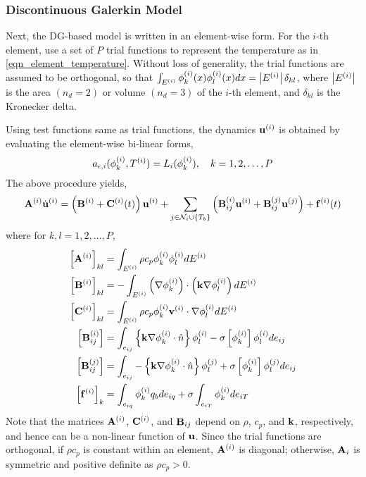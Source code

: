 \subsubsection{Discontinuous Galerkin Model}

Next, the DG-based model is written in an element-wise form. For the $i$-th element, use a set of $P$ trial functions to represent the temperature as in \cref{eqn_element_temperature}. Without loss of generality, the trial functions are assumed to be orthogonal, so that $\int_{E^{(i)}} \phi^{(i)}_k(x) \phi^{(i)}_l(x) dx = \left|E^{(i)}\right|\delta_{kl}$, where $\left|E^{(i)}\right|$ is the area $(n_d=2)$ or volume $(n_d=3)$ of the $i$-th element, and $\delta_{kl}$ is the Kronecker delta.

Using test functions same as trial functions, the dynamics $\mathbf{u}^{(i)}$ is obtained by evaluating the element-wise bi-linear forms,
\begin{equation}
    a_{\epsilon,i}(\phi_k^{(i)},T^{(i)}) = L_i(\phi_k^{(i)}),\quad k=1,2,\dots,P
\end{equation}
The above procedure yields,
\begin{equation}
    \mathbf{A}^{(i)}\dot{\mathbf{u}}^{(i)} = \left(\mathbf{B}^{(i)} + \mathbf{C}^{(i)}(t)\right)\mathbf{u}^{(i)} + \sum_{j\in\mathcal{N}_i\cup\left\{T_b\right\}}\left(\mathbf{B}^{(i)}_{ij}\mathbf{u}^{(i)} + \mathbf{B}^{(j)}_{ij}\mathbf{u}^{(j)}\right) + \mathbf{f}^{(i)}(t)\label{eqn_element_wise_model}
\end{equation}
where for $k,l=1,2,\dots,P$,
\begin{subequations}
    \begin{align}
        \left[\mathbf{A}^{(i)}\right]_{kl} &= \int_{E^{(i)}}\rho c_p\phi_k^{(i)}\phi_l^{(i)}dE^{(i)}\\
        \left[\mathbf{B}^{(i)}\right]_{kl} &= -\int_{E^{(i)}}\left(\nabla\phi_k^{(i)}\right)\cdot\left(\mathbf{k}\nabla\phi_l^{(i)}\right)dE^{(i)}\\
        \left[\mathbf{C}^{(i)}\right]_{kl} &= \int_{E^{(i)}}\rho c_p \phi_k^{(i)}\mathbf{v}^{(i)}\cdot\nabla\phi_l^{(i)}dE^{(i)}\\
        \left[\mathbf{B}^{(i)}_{ij}\right] &= \int_{e_{ij}}\left\{\mathbf{k}\nabla\phi_k^{(i)}\cdot\hat{n}\right\}\phi_l^{(i)} - \sigma\left[\phi_k^{(i)}\right]\phi_l^{(i)}de_{ij}\\
        \left[\mathbf{B}^{(j)}_{ij}\right] &= \int_{e_{ij}}-\left\{\mathbf{k}\nabla\phi_k^{(i)}\cdot\hat{n}\right\}\phi_l^{(j)} + \sigma\left[\phi_k^{(i)}\right]\phi_l^{(j)}de_{ij}\\
        \left[\mathbf{f}^{(i)}\right]_k &= \int_{e_{iq}}\phi_k^{(i)}q_bde_{iq} + \sigma\int_{e_{iT}}\phi_k^{(i)}de_{iT}
    \end{align}
\end{subequations}
Note that the matrices $\mathbf{A}^{(i)}$, $\mathbf{C}^{(i)}$, and $\mathbf{B}_{ij}$ depend on $\rho$, $c_p$, and $\mathbf{k}$, respectively, and hence can be a non-linear function of $\mathbf{u}$. Since the trial functions are orthogonal, if $\rho c_p$ is constant within an element, $\mathbf{A}^{(i)}$ is diagonal; otherwise, $\mathbf{A}_i$ is symmetric and positive definite as $\rho c_p > 0$.

